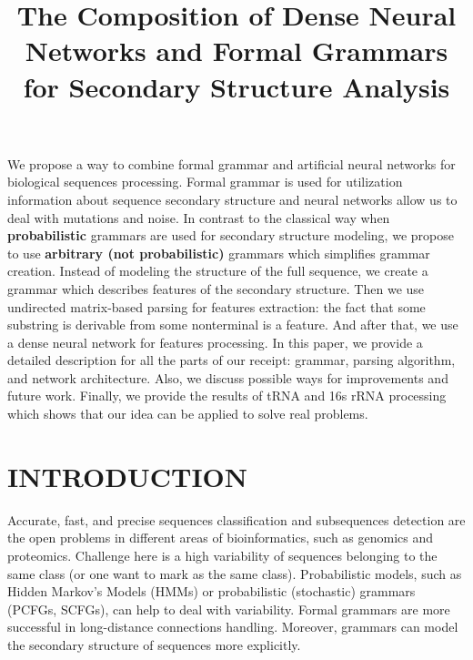 \documentclass[a4paper,twoside]{article}
\begin{document}
\title{The Composition of Dense Neural Networks and Formal Grammars for Secondary Structure Analysis}

\author{
}


\abstract
{
We propose a way to combine formal grammar and artificial neural networks for biological sequences processing.
Formal grammar is used for utilization information about sequence secondary structure and neural networks allow us to deal with mutations and noise.
In contrast to the classical way when \textbf{probabilistic} grammars are used for secondary structure modeling, we propose to use \textbf{arbitrary (not probabilistic)} grammars which simplifies grammar creation.
Instead of modeling the structure of the full sequence, we create a grammar which describes features of the secondary structure.
Then we use undirected matrix-based parsing for features extraction: the fact that some substring is derivable from some nonterminal is a feature. 
And after that, we use a dense neural network for features processing.
In this paper, we provide a detailed description for all the parts of our receipt: grammar, parsing algorithm, and network architecture.
Also, we discuss possible ways for improvements and future work.
Finally, we provide the results of tRNA and 16s rRNA processing which shows that our idea can be applied to solve real problems.
}

\onecolumn \maketitle \normalsize \vfill

\section{\uppercase{Introduction}}
\label{sec:introduction}

\noindent Accurate, fast, and precise sequences classification and subsequences detection are the open problems in different areas of bioinformatics, such as genomics and proteomics. 
Challenge here is a high variability of sequences belonging to the same class (or one want to mark as the same class).
Probabilistic models, such as Hidden Markov's Models (HMMs) or probabilistic (stochastic) grammars (PCFGs, SCFGs), can help to deal with variability.
Formal grammars are more successful in long-distance connections handling.
Moreover, grammars can model the secondary structure of sequences more explicitly.
\end{document}
